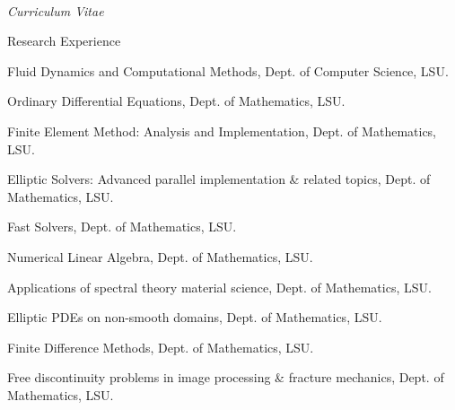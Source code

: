 \documentclass[10pt]{article}
\newenvironment{sublist}{%
	\begin{list}{}{%
		\setlength{\itemsep}{0em}\setlength{\parsep}{0em}%
		\setlength{\topsep}{0em}\setlength{\parskip}{0em}%
	}%
}%
{ \end{list} }
\begin{document}
\begin{cv}{\name\\{\large \itshape Curriculum Vitae}}
\begin{cvlist}{Research Experience}
\begin{sublist}
		\item Fluid Dynamics and Computational Methods, Dept. of Computer Science, LSU.
		\item Ordinary Differential Equations, Dept. of Mathematics, LSU.
		\item Finite Element Method: Analysis and Implementation, Dept. of Mathematics, LSU.
		\item Elliptic Solvers: Advanced parallel implementation \& related topics, Dept. of Mathematics, LSU.
		\item Fast Solvers, Dept. of Mathematics, LSU.
		\item Numerical Linear Algebra, Dept. of Mathematics, LSU.
		\item Applications of spectral theory material science, Dept. of Mathematics, LSU.
		\item Elliptic PDEs on non-smooth domains, Dept. of Mathematics, LSU.
		\item Finite Difference Methods, Dept. of Mathematics, LSU.
		\item Free discontinuity problems in image processing \& fracture mechanics, Dept. of Mathematics, LSU.
	\end{sublist}


\end{cvlist}
\end{cv}
\end{document}
